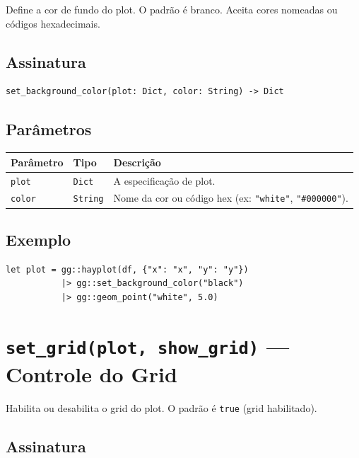 \documentclass[12pt, a4paper, oneside]{book}
\newcommand{\code}[1]{\texttt{#1}}
\begin{document}
Define a cor de fundo do plot. O padrão é branco. Aceita cores nomeadas ou códigos hexadecimais.

\subsection*{Assinatura}

\begin{lstlisting}[style=inline]
set_background_color(plot: Dict, color: String) -> Dict
\end{lstlisting}

\subsection*{Parâmetros}

\begin{tabularx}{\textwidth}{@{}lL{2.5cm}X@{}}
  \toprule
  \textbf{Parâmetro} & \textbf{Tipo} & \textbf{Descrição} \\
  \midrule
  \code{plot}  & \code{Dict}   & A especificação de plot. \\[4pt]
  \code{color} & \code{String} & Nome da cor ou código hex (ex: \code{"white"}, \code{"\#000000"}). \\
  \bottomrule
\end{tabularx}

\subsection*{Exemplo}

\begin{lstlisting}[caption={Tema escuro}]
let plot = gg::hayplot(df, {"x": "x", "y": "y"})
           |> gg::set_background_color("black")
           |> gg::geom_point("white", 5.0)
\end{lstlisting}

\section{\texttt{set\_grid(plot, show\_grid)} --- Controle do Grid}

Habilita ou desabilita o grid do plot. O padrão é \code{true} (grid habilitado).

\subsection*{Assinatura}
\end{document}
